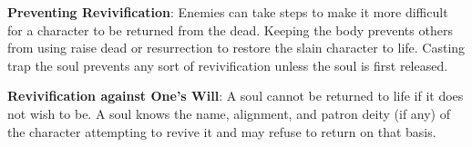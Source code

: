 \textbf{Preventing Revivification}: Enemies can take steps to make it more difficult for a character to be returned from the dead. Keeping the body prevents others from using raise dead or resurrection to restore the slain character to life. Casting trap the soul prevents any sort of revivification unless the soul is first released.

\textbf{Revivification against One's Will}: A soul cannot be returned to life if it does not wish to be. A soul knows the name, alignment, and patron deity (if any) of the character attempting to revive it and may refuse to return on that basis.

